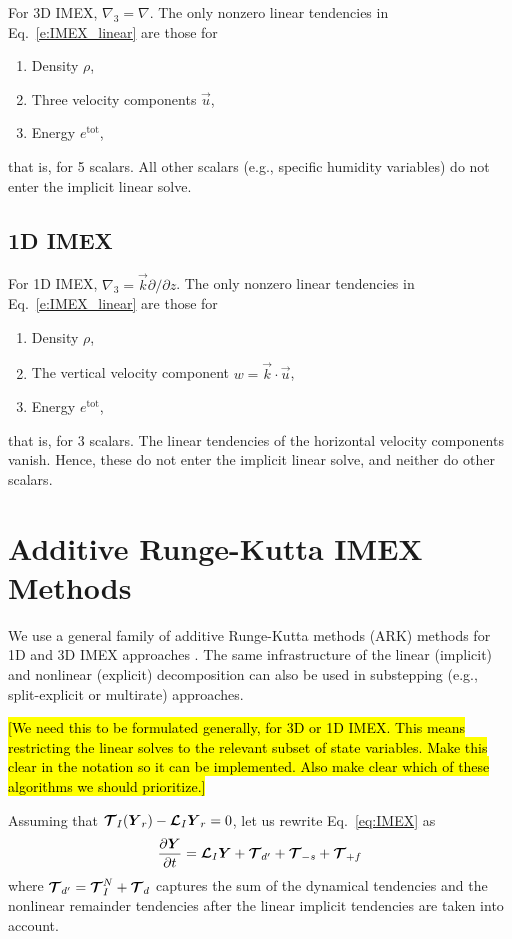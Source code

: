 \documentclass{report}
\numberwithin{equation}{section}
\begin{document}
For 3D IMEX, $\nabla_{3} = \nabla$. The only nonzero linear tendencies in Eq.~\eqref{e:IMEX_linear} are those for 
\begin{enumerate}
    \item Density $\rho$,
    \item Three velocity components $\vec{u}$,
    \item Energy $e^{\mathrm{tot}}$,
\end{enumerate}
that is, for 5 scalars. All other scalars (e.g., specific humidity variables) do not enter the implicit linear solve. 

\subsection{1D IMEX}

For 1D IMEX, $\nabla_{3} = \vec{k} \partial/\partial z$. The only nonzero linear tendencies in Eq.~\eqref{e:IMEX_linear} are those for 
\begin{enumerate}
    \item Density $\rho$,
    \item The vertical velocity component $w = \vec{k} \cdot \vec{u}$,
    \item Energy $e^{\mathrm{tot}}$,
\end{enumerate}
that is, for 3 scalars. The linear tendencies of the horizontal velocity components vanish. Hence, these do not enter the implicit linear solve, and neither do other scalars. 

\section{Additive Runge-Kutta IMEX Methods}

We use a general family of additive Runge-Kutta methods (ARK) methods for 1D and 3D IMEX approaches \citep[see, e.g.,][]{giraldo:2013,Weller13a,Gardner18a}. The same infrastructure of the linear (implicit) and nonlinear (explicit) decomposition can also be used in substepping (e.g., split-explicit or multirate) approaches.

\hl{[We need this to be formulated generally, for 3D or 1D IMEX. This means restricting the linear solves to the relevant subset of state variables. Make this clear in the notation so it can be implemented. Also make clear which of these algorithms we should prioritize.]}

Assuming that $\boldsymbol{{\mathcal{T}}}_I(\boldsymbol{{Y}}_r) - \boldsymbol{{\mathcal{L}}}_I \boldsymbol{{Y}}_r=0$, let us
rewrite Eq.~\eqref{eq:IMEX} as
\begin{equation}
\label{eq:IMEX_v3}
\frac{\partial\boldsymbol{{Y}}}{\partial t} =  \boldsymbol{{\mathcal{L}}}_I \boldsymbol{{Y}} + \boldsymbol{{\mathcal{T}}}_{d'} + \boldsymbol{{\mathcal{T}}}_{-s} + \boldsymbol{{\mathcal{T}}}_{+f}
\end{equation}
where $\boldsymbol{{\mathcal{T}}}_{d'}=\boldsymbol{{\mathcal{T}}}^N_{I} + \boldsymbol{{\mathcal{T}}}_{d}$ captures the sum of the dynamical tendencies and the nonlinear remainder tendencies after the linear implicit tendencies are taken into account.  
\end{document}
